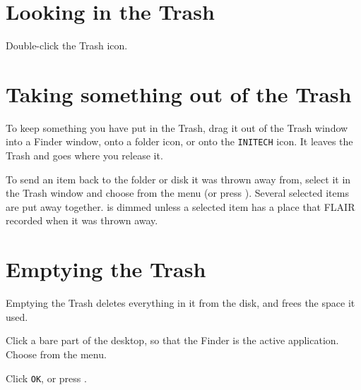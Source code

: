 \section{Looking in the Trash}
\begin{TaskSteps}
\Step Double-click the Trash icon.
\end{TaskSteps}


\section{Taking something out of the Trash}
To keep something you have put in the Trash, drag it out of the Trash
window into a Finder window, onto a folder icon, or onto the
\texttt{INITECH} icon.  It leaves the Trash and goes where you release it.

To send an item back to the folder or disk it was thrown
away from, select it in the Trash window and choose  from
the  menu (or press ).  Several selected items are
put away together.   is dimmed unless a selected item has a
place that FLAIR recorded when it was thrown away.


\section{Emptying the Trash}
Emptying the Trash deletes everything in it from the disk, and frees the
space it used.
\begin{TaskSteps}
\Step Click a bare part of the desktop, so that the Finder is the active
application.
\Step Choose  from the  menu.
\end{TaskSteps}


\begin{TaskSteps}[resume]
\Step Click \texttt{OK}, or press .
\end{TaskSteps}

